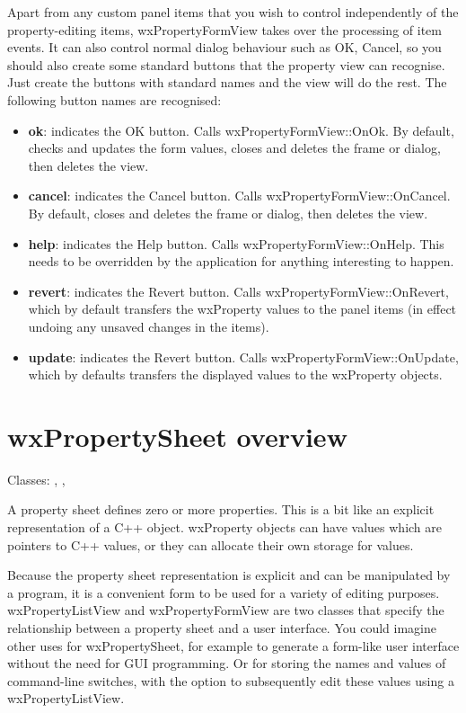 Apart from any custom panel items that you wish to control independently
of the property-editing items, wxPropertyFormView takes over the
processing of item events. It can also control normal dialog behaviour such
as OK, Cancel, so you should also create some standard buttons that the property view
can recognise. Just create the buttons with standard names and the view
will do the rest. The following button names are recognised:

\begin{itemize}\itemsep=0pt
\item {\bf ok}: indicates the OK button. Calls wxPropertyFormView::OnOk. By default,
checks and updates the form values, closes and deletes the frame or dialog, then deletes the view.
\item {\bf cancel}: indicates the Cancel button. Calls wxPropertyFormView::OnCancel. By default,
closes and deletes the frame or dialog, then deletes the view.
\item {\bf help}: indicates the Help button. Calls wxPropertyFormView::OnHelp. This needs
to be overridden by the application for anything interesting to happen.
\item {\bf revert}: indicates the Revert button. Calls wxPropertyFormView::OnRevert,
which by default transfers the wxProperty values to the panel items (in effect
undoing any unsaved changes in the items).
\item {\bf update}: indicates the Revert button. Calls wxPropertyFormView::OnUpdate, which
by defaults transfers the displayed values to the wxProperty objects.
\end{itemize}

\section{wxPropertySheet overview}\label{wxpropertysheetoverview}

Classes: , , 

A property sheet defines zero or more properties. This is a bit like an explicit representation of
a C++ object. wxProperty objects can have values which are pointers to C++ values, or they
can allocate their own storage for values.

Because the property sheet representation is explicit and can be manipulated by
a program, it is a convenient form to be used for a variety of
editing purposes. wxPropertyListView and wxPropertyFormView are two classes that
specify the relationship between a property sheet and a user interface. You could imagine
other uses for wxPropertySheet, for example to generate a form-like user interface without
the need for GUI programming. Or for storing the names and values of command-line switches, with the
option to subsequently edit these values using a wxPropertyListView.

